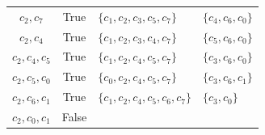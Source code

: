 \documentclass[11pt]{article}
\begin{document}
\begin{table}[!h]
\begin{tabular}{c|c|l|l}
$c_{2}, c_{7}$          & True & $\{c_{1}, c_{2}, c_{3}, c_{5}, c_{7}\}$ &                  $\{c_{4}, c_{6}, c_{0}\}$ \\
$c_{2}, c_{4}$          & True & $\{c_{1}, c_{2}, c_{3}, c_{4}, c_{7}\}$ &                  $\{c_{5}, c_{6}, c_{0}\}$ \\
$c_{2}, c_{4}, c_{5}$   & True & $\{c_{1}, c_{2}, c_{4}, c_{5}, c_{7}\}$                    &$\{c_{3}, c_{6}, c_{0}\}$ \\
$c_{2}, c_{5}, c_{0}$   & True & $\{c_{0}, c_{2}, c_{4}, c_{5}, c_{7}\}$                    &$\{c_{3}, c_{6}, c_{1}\}$ \\
$c_{2}, c_{6}, c_{1}$   & True & $\{c_{1}, c_{2}, c_{4}, c_{5}, c_{6}, c_{7}\}$             &$\{c_{3}, c_{0}\}$ \\
$c_{2}, c_{0}, c_{1}$   & False &                                                           & 
		\end{tabular}
\end{table}

	
	
	
	
	
	\clearpage
	
	
\end{document}
